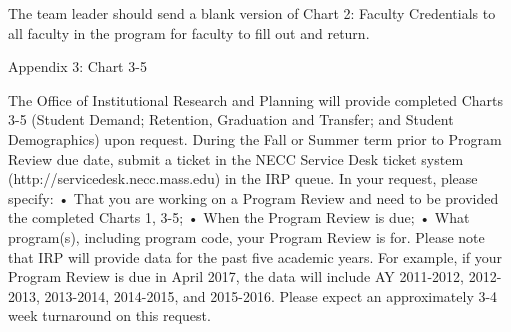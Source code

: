 The team leader should send a blank version of Chart 2: Faculty Credentials to all faculty in the program for faculty to fill out and return.


Appendix 3: Chart 3-5 

The Office of Institutional Research and Planning will provide completed Charts 3-5 (Student Demand; Retention, Graduation and Transfer; and Student Demographics) upon request. During the Fall or Summer term prior to Program Review due date, submit a ticket in the NECC Service Desk ticket system (http://servicedesk.necc.mass.edu) in the IRP queue. In your request, please specify:
    • That you are working on a Program Review and need to be provided the completed Charts 1, 3-5;
    • When the Program Review is due;
    • What program(s), including program code, your Program Review is for.
Please note that IRP will provide data for the past five academic years. For example, if your Program Review is due in April 2017, the data will include AY 2011-2012, 2012-2013, 2013-2014, 2014-2015, and 2015-2016.
Please expect an approximately 3-4 week turnaround on this request.

